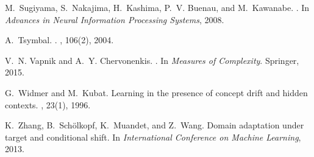 \documentclass[11pt]{article}
\begin{document}
\begin{thebibliography}{10}
M.~Sugiyama, S.~Nakajima, H.~Kashima, P.~V. Buenau, and M.~Kawanabe.
.
\newblock In {\em Advances in Neural Information Processing Systems}, 2008.

A.~Tsymbal.
.
, 106(2),
  2004.

V.~N. Vapnik and A.~Y. Chervonenkis.
.
\newblock In {\em Measures of Complexity}. Springer, 2015.

G.~Widmer and M.~Kubat.
\newblock Learning in the presence of concept drift and hidden contexts.
, 23(1), 1996.

K.~Zhang, B.~Sch{\"o}lkopf, K.~Muandet, and Z.~Wang.
\newblock Domain adaptation under target and conditional shift.
\newblock In {\em International Conference on Machine Learning}, 2013.

\end{thebibliography}
\end{document}
